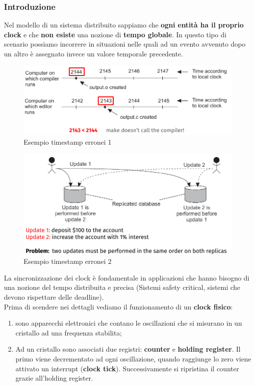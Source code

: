 \documentclass[12pt]{article}
\begin{document}
		\subsubsection{Introduzione}
			Nel modello di un sistema distribuito sappiamo che \textbf{ogni entità ha il proprio clock }e che \textbf{non esiste} una nozione di \textbf{tempo globale}. In questo tipo di scenario possiamo incorrere in situazioni nelle quali ad un evento avvenuto dopo un altro è assegnato invece un valore temporale precedente.	
			\begin{figure}[h!]
				\centering
				\includegraphics[scale=0.40]{img/clocks.png}
				\caption{Esempio timestamp erronei 1}
			\end{figure}
			\begin{figure}[h!]
				\centering
				\includegraphics[scale=0.30]{img/database.png}
				\caption{Esempio timestamp erronei 2}
			\end{figure}
			La sincronizzazione dei clock è fondamentale in applicazioni che hanno bisogno di una nozione del tempo distribuita e precisa (Sistemi safety critical, sistemi che devono rispettare delle deadline). \\
			Prima di scendere nei dettagli vediamo il funzionamento di un \textbf{clock fisico}:
			\begin{enumerate}
				\item sono apparecchi elettronici che contano le oscillazioni che si misurano in un cristallo ad una frequenza stabilita;
				\item Ad un cristallo sono associati due registri: \textbf{counter} e \textbf{holding register}. Il primo viene decrementato ad ogni oscillazione, quando raggiunge lo zero viene attivato un interrupt (\textbf{clock tick}). Successivamente si ripristina il counter grazie all'holding register.
			\end{enumerate}
\end{document}
